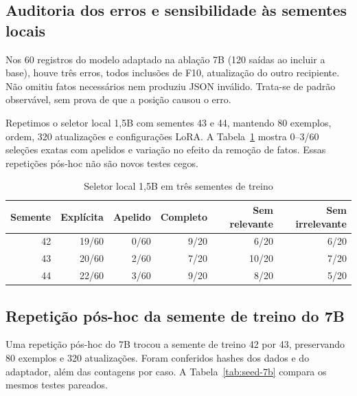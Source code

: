 \documentclass[12pt,a4paper]{article}
\begin{document}
\subsection{Auditoria dos erros e sensibilidade às sementes locais}
Nos 60 registros do modelo adaptado na ablação 7B (120 saídas ao incluir a base), houve três erros, todos inclusões de F10, atualização do outro recipiente. Não omitiu fatos necessários nem produziu JSON inválido. Trata-se de padrão observável, sem prova de que a posição causou o erro.

Repetimos o seletor local 1,5B com sementes 43 e 44, mantendo 80 exemplos, ordem, 320 atualizações e configurações LoRA. A Tabela~\ref{tab:seed-stability} mostra 0--3/60 seleções exatas com apelidos e variação no efeito da remoção de fatos. Essas repetições pós-hoc não são novos testes cegos.

\begin{table}[htbp]\centering\caption{Seletor local 1,5B em três sementes de treino}\label{tab:seed-stability}\begin{tabular}{rrrrrr}\toprule Semente & Explícita & Apelido & Completo & Sem relevante & Sem irrelevante\\\midrule 42 & 19/60 & 0/60 & 9/20 & 6/20 & 6/20\\ 43 & 20/60 & 2/60 & 7/20 & 10/20 & 7/20\\ 44 & 22/60 & 3/60 & 9/20 & 8/20 & 5/20\\ \bottomrule\end{tabular}\par{}\end{table}

\subsection{Repetição pós-hoc da semente de treino do 7B}
Uma repetição pós-hoc do 7B trocou a semente de treino 42 por 43, preservando 80 exemplos e 320 atualizações. Foram conferidos hashes dos dados e do adaptador, além das contagens por caso. A Tabela~\ref{tab:seed-7b} compara os mesmos testes pareados.
\end{document}
